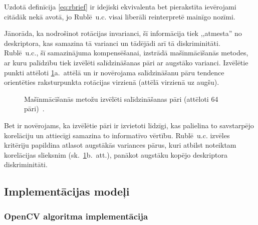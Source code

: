 Uzdotā definīcija \eqref{eq:rbrief} ir idejiski ekvivalenta bet 
pierakstīta ievērojami citādāk nekā \cite{ORB} avotā, jo 
Rublē~u.c. visai liberāli reinterpretē mainīgo nozīmi.

Jānorāda, ka nodrošinot rotācijas invarianci, šī informācija tiek
,,atmesta'' no deskriptora, kas samazina tā varianci un tādējādi arī
tā diskriminitāti. Rublē~u.c.\cite{ORB}, šī samazinājuma kompensēšanai,
izstrādā mašīnmācīšanās metodes, ar kuru palīdzību tiek izvēlēti
salīdzināšanas pāri ar augstāko varianci. Izvēlētie punkti attēloti
\ref{fig:pattern2}a.~attēlā un ir novērojama salīdzināšanu pāru tendence
orientēties raksturpunkta rotācijas virzienā (attēlā virzienā uz augšu).
\begin{figure}[tbh]
	\centering
	\def\svgwidth{0.7\linewidth}
	{}
	\caption{Mašīnmācīšanās metožu izvēlēti salīdzināšanas pāri
		(attēloti 64 pāri)~\cite{ORB}.}
	\label{fig:pattern2}
\end{figure}
Bet ir novērojams, ka izvēlētie pāri ir izvietoti līdzīgi, kas palielina
to savstarpējo korelāciju
un attiecīgi samazina to informatīvo vērtību. Rublē~u.c.\cite{ORB} izvēles
kritēriju papildina atlasot augstākās variances pārus, kuri atbilst
noteiktam korelācijas slieksnim (sk.~\ref{fig:pattern2}b.~att.), panākot
augstāku kopējo deskriptora diskriminitāti.

\subsection{Implementācijas modeļi}
\subsubsection{OpenCV algoritma implementācija} \label{sec:rbrief-ocv}
\TODO
